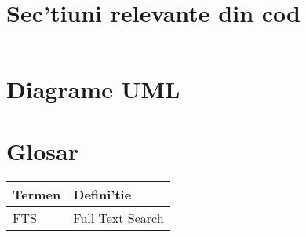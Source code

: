 \appendix
\chapter{Sec'tiuni relevante din cod}

\begin{verbatim}

\end{verbatim}

\listoffigures

\listoftables

\chapter{Diagrame UML}

\chapter{Glosar}
\begin{center}
\begin{table}[H]
\centering
\begin{tabu} to 0.8\textwidth { | X[c] | X[c] |  }
 \hline
 Termen     & Defini'tie\\
 \hline
 FTS   & Full Text Search   \\
 \hline
\end{tabu}
\end{table}
\end{center}
